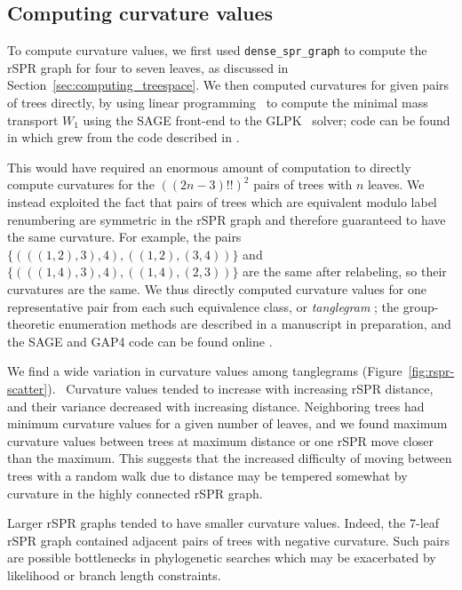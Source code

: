 \documentclass[11pt,onecolumn,conference]{IEEEtran}
\begin{document}
\subsection{Computing curvature values}
To compute curvature values, we first used \texttt{dense\_spr\_graph} to compute the rSPR graph for four to seven leaves, as discussed in Section~\ref{sec:computing_treespace}.
We then computed curvatures for given pairs of trees directly, by using linear programming~\cite{Loisel2014-hu} to compute the minimal mass transport $W_1$ using the SAGE \cite{SAGE} front-end to the GLPK~\cite{glpk} solver; code can be found in \cite{gricci} which grew from the code described in \cite{Loisel2014-hu}.

This would have required an enormous amount of computation to directly compute curvatures for the $((2n-3)!!)^2$ pairs of trees with $n$ leaves.
We instead exploited the fact that pairs of trees which are equivalent modulo label renumbering are symmetric in the rSPR graph and therefore guaranteed to have the same curvature.
For example, the pairs
$\{(((1,2),3),4), ((1,2),(3,4))\}$ and
$\{(((1,4),3),4), ((1,4),(2,3))\}$
are the same after relabeling, so their curvatures are the same.
We thus directly computed curvature values for one representative pair from each such equivalence class, or \emph{tanglegram} \cite{Venkatachalam2010-zh}; the group-theoretic enumeration methods are described in a manuscript in preparation, and the SAGE \cite{SAGE} and GAP4 \cite{GAP4} code can be found online \cite{tangle}.

We find a wide variation in curvature values among tanglegrams (Figure~\ref{fig:rspr-scatter}).~
Curvature values tended to increase with increasing rSPR distance, and their variance decreased with increasing distance.
Neighboring trees had minimum curvature values for a given number of leaves, and we found maximum curvature values between trees at maximum distance or one rSPR move closer than the maximum.
This suggests that the increased difficulty of moving between trees with a random walk due to distance may be tempered somewhat by curvature in the highly connected rSPR graph.

Larger rSPR graphs tended to have smaller curvature values.
Indeed, the 7-leaf rSPR graph contained adjacent pairs of trees with negative curvature.
Such pairs are possible bottlenecks in phylogenetic searches which may be exacerbated by likelihood or branch length constraints.
\end{document}
